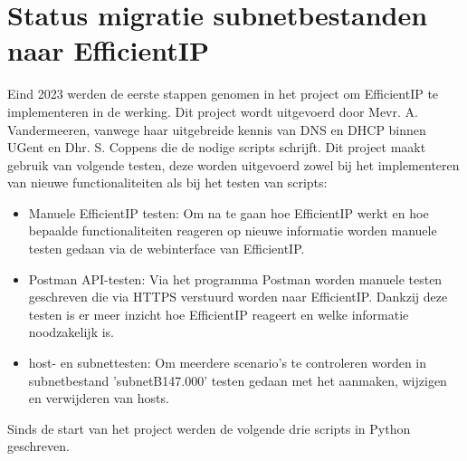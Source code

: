 \section{Status migratie subnetbestanden naar EfficientIP}
\label{premigratie}
Eind 2023 werden de eerste stappen genomen in het project om EfficientIP te implementeren in de werking. Dit project wordt uitgevoerd door Mevr. A. Vandermeeren, vanwege haar uitgebreide kennis van DNS en DHCP binnen UGent en Dhr. S. Coppens die de nodige scripts schrijft.
Dit project maakt gebruik van volgende testen, deze worden uitgevoerd zowel bij het implementeren van nieuwe functionaliteiten als bij het testen van scripts:
\begin{itemize}
    \item Manuele EfficientIP testen: Om na te gaan hoe EfficientIP werkt en hoe bepaalde functionaliteiten reageren op nieuwe informatie worden manuele testen gedaan via de webinterface van EfficientIP.
    \item Postman API-testen: Via het programma Postman worden manuele testen geschreven die via HTTPS verstuurd worden naar EfficientIP. Dankzij deze testen is er meer inzicht hoe EfficientIP reageert en welke informatie noodzakelijk is.
    \item host- en subnettesten: Om meerdere scenario's te controleren worden in subnetbestand 'subnetB147.000' testen gedaan met het aanmaken, wijzigen en verwijderen van hosts.
\end{itemize}
Sinds de start van het project werden de volgende drie scripts in Python geschreven.
